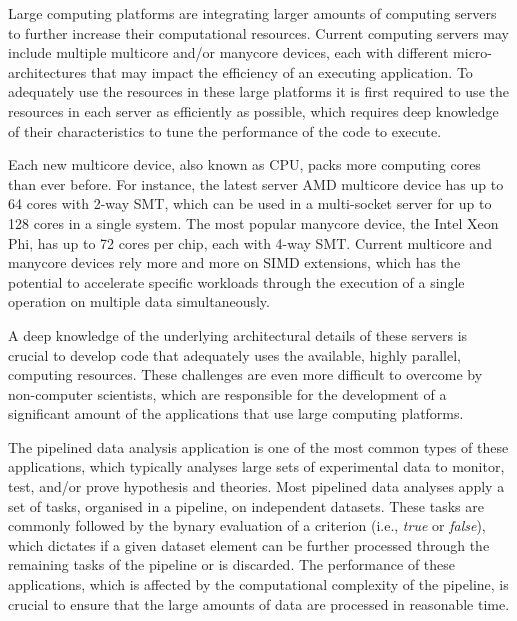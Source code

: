



Large computing platforms are integrating larger amounts of computing servers to further increase their computational resources.
Current computing servers may include multiple multicore and/or manycore devices, each with different micro-architectures that may impact the efficiency of an executing application.
To adequately use the resources in these large platforms it is first required to use the resources in each server as efficiently as possible, which requires deep knowledge of their characteristics to tune the performance of the code to execute.

Each new multicore device, also known as CPU, packs more computing cores than ever before.
For instance, the latest server AMD multicore device has up to 64 cores with 2-way SMT, which can be used in a multi-socket server for up to 128 cores in a single system.
The most popular manycore device, the Intel Xeon Phi, has up to 72 cores per chip, each with 4-way SMT.
Current multicore and manycore devices rely more and more on SIMD extensions, which has the potential to accelerate specific workloads through the execution of a single operation on multiple data simultaneously.

A deep knowledge of the underlying architectural details of these servers is crucial to develop code that adequately uses the available, highly parallel, computing resources.
These challenges are even more difficult to overcome by non-computer scientists, which are responsible for the development of a significant amount of the applications that use large computing platforms.

The pipelined data analysis application is one of the most common types of these applications, which typically analyses large sets of experimental data to monitor, test, and/or prove hypothesis and theories.
Most pipelined data analyses apply a set of tasks, organised in a pipeline, on independent datasets.
These tasks are commonly followed by the bynary evaluation of a criterion (i.e., \textit{true} or \textit{false}), which dictates if a given dataset element can be further processed through the remaining tasks of the pipeline or is discarded.
The performance of these applications, which is affected by the computational complexity of the pipeline, is crucial to ensure that the large amounts of data are processed in reasonable time.

